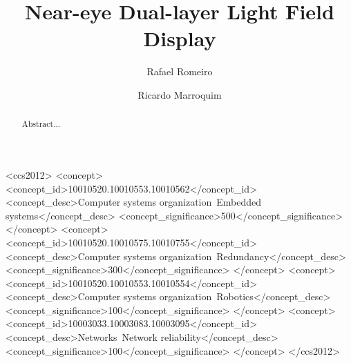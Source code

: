 \documentclass[acmtog,review,anonymous]{acmart}
\begin{document}
\title{Near-eye Dual-layer Light Field Display}

\author{Rafael Romeiro}

\author{Ricardo Marroquim}

\renewcommand{\shortauthors}{R. Romeiro et. al.}

\begin{abstract}
Abstract...
\end{abstract}


%
%
\begin{CCSXML}
<ccs2012>
 <concept>
  <concept_id>10010520.10010553.10010562</concept_id>
  <concept_desc>Computer systems organization~Embedded systems</concept_desc>
  <concept_significance>500</concept_significance>
 </concept>
 <concept>
  <concept_id>10010520.10010575.10010755</concept_id>
  <concept_desc>Computer systems organization~Redundancy</concept_desc>
  <concept_significance>300</concept_significance>
 </concept>
 <concept>
  <concept_id>10010520.10010553.10010554</concept_id>
  <concept_desc>Computer systems organization~Robotics</concept_desc>
  <concept_significance>100</concept_significance>
 </concept>
 <concept>
  <concept_id>10003033.10003083.10003095</concept_id>
  <concept_desc>Networks~Network reliability</concept_desc>
  <concept_significance>100</concept_significance>
 </concept>
</ccs2012>
\end{CCSXML}


%
%


\end{document}
